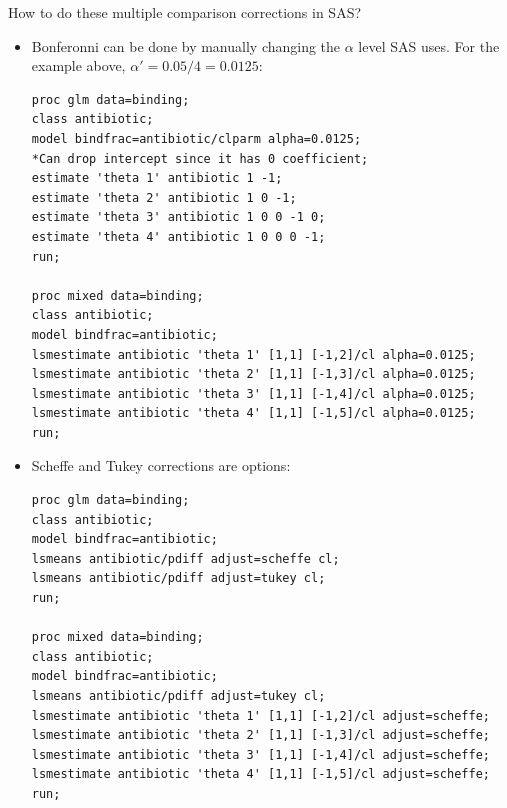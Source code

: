 How to do these multiple comparison corrections in SAS?\\
\begin{itemize}
\item Bonferonni can be done by manually changing the $\alpha$ level SAS uses.  For the example above, $\alpha'=0.05/4=0.0125$:\\
\begin{small}
\begin{verbatim}
proc glm data=binding;
class antibiotic;
model bindfrac=antibiotic/clparm alpha=0.0125;
*Can drop intercept since it has 0 coefficient;
estimate 'theta 1' antibiotic 1 -1; 
estimate 'theta 2' antibiotic 1 0 -1;
estimate 'theta 3' antibiotic 1 0 0 -1 0;
estimate 'theta 4' antibiotic 1 0 0 0 -1;
run;

proc mixed data=binding;
class antibiotic;
model bindfrac=antibiotic;
lsmestimate antibiotic 'theta 1' [1,1] [-1,2]/cl alpha=0.0125;
lsmestimate antibiotic 'theta 2' [1,1] [-1,3]/cl alpha=0.0125;
lsmestimate antibiotic 'theta 3' [1,1] [-1,4]/cl alpha=0.0125;
lsmestimate antibiotic 'theta 4' [1,1] [-1,5]/cl alpha=0.0125;
run;
\end{verbatim}
\end{small}

\item Scheffe and Tukey corrections are options:
\begin{small}
\begin{verbatim}
proc glm data=binding;
class antibiotic;
model bindfrac=antibiotic;
lsmeans antibiotic/pdiff adjust=scheffe cl;
lsmeans antibiotic/pdiff adjust=tukey cl;
run;

proc mixed data=binding;
class antibiotic;
model bindfrac=antibiotic;
lsmeans antibiotic/pdiff adjust=tukey cl;
lsmestimate antibiotic 'theta 1' [1,1] [-1,2]/cl adjust=scheffe;
lsmestimate antibiotic 'theta 2' [1,1] [-1,3]/cl adjust=scheffe;
lsmestimate antibiotic 'theta 3' [1,1] [-1,4]/cl adjust=scheffe;
lsmestimate antibiotic 'theta 4' [1,1] [-1,5]/cl adjust=scheffe;
run;
\end{verbatim}
\end{small}
\end{itemize}

\newpage

